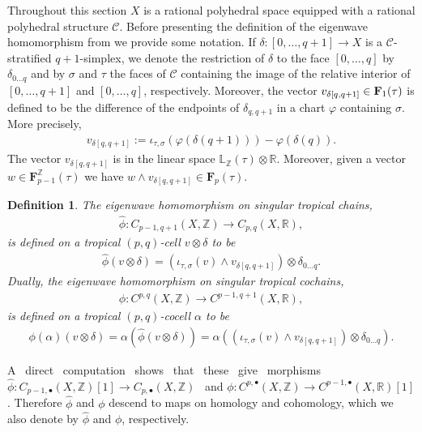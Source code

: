 \documentclass[11pt]{article}
\numberwithin{equation}{numsection}
\newcommand{\Z}{{\mathbb Z}}
\newcommand{\CC}{{\mathcal C}}
\newcommand{\R}{{\mathbb R}}
\newcommand{\phihat}{\hat{\phi}}
\newcommand{\imap}{\iota_{\tau,\sigma}}
\newtheorem{defn}[thm]{Definition}
\begin{document}
Throughout this section $X$ is a rational  polyhedral space equipped with a rational  polyhedral structure $\CC$. 
Before presenting the definition of the eigenwave homomorphism from \cite{MikZhar} we provide some notation. 
If  $\delta \colon [0, \dots, q+1] \to X$ is a $\CC$-stratified $q+1$-simplex, 
we denote the restriction of $\delta$ to the face $[0, \dots, q]$ by $\delta_{0 \dots q}$
and by $\sigma$ and $\tau$ the faces of $\CC$ containing the image of the relative interior of $[0,\dots,q+1]$ and $[0,\dots,q]$, respectively.
Moreover, the  vector   
$v_{\delta[q,q+1]} \in {\bf F}_1(\tau)$ is defined to be  the difference of the endpoints  of $\delta_{q,q+1}$ in a chart $\varphi$
containing  $\sigma$.   
More precisely, 
\begin{align}\label{eqn:wavevector}
v_{\delta[q,q+1]} := \imap(\varphi(\delta(q+1))) - \varphi(\delta(q)).
\end{align}
The vector  $v_{\delta[q,q+1]}$ is in the linear space $\mathbb{L}_{\Z}(\tau) \otimes \R$. Moreover, 
given a vector $w \in \mathbf{F}^{\Z}_{p-1}(\tau)$ we have  $w \wedge v_{\delta[q,q+1]} \in \mathbf{F}_p(\tau)$. 
\begin{defn} \label{def:eigenwave}
The eigenwave  homomorphism on singular tropical chains, 
\begin{align*}
\phihat \colon C_{p-1,q+1}(X, \Z) \to C_{p, q}(X, \R),
\end{align*}
is defined on a tropical $(p,q)$-cell $v \otimes \delta$ to be
\begin{align*}
\phihat(v \otimes \delta)  = (\imap(v) \wedge v_{\delta[q,q+1]}) \otimes \delta_{0 \dots q}.
\end{align*} 
Dually, the eigenwave  homomorphism on singular tropical cochains, 
\begin{align*}
\phi \colon C^{p,q}(X, \Z) \to C^{p-1, q+1}(X, \R),
\end{align*}
is defined on a tropical $(p,q)$-cocell $\alpha$ to be
\begin{align*}
\phi(\alpha)(v \otimes \delta)  = \alpha(\phihat(v \otimes \delta)) = 
\alpha \left( (\imap(v) \wedge v_{\delta[q,q+1]}) \otimes \delta_{0 \dots q} \right).
\end{align*} 
\end{defn}

A \ direct \ computation \ shows \ that \ these \ give \ morphisms \
$\phihat \colon C_{p-1,\bullet}(X, \Z)[1] \to C_{p,\bullet}(X, \Z)$ \ and 
$\phi \colon C^{p,\bullet}(X, \Z) \to C^{p-1, \bullet}(X, \R)[1]$.
 Therefore $\phihat$ and $\phi$ descend to maps  on homology and  cohomology, 
which we also denote by $\phihat$ and $\phi$, 
respectively.
\end{document}
